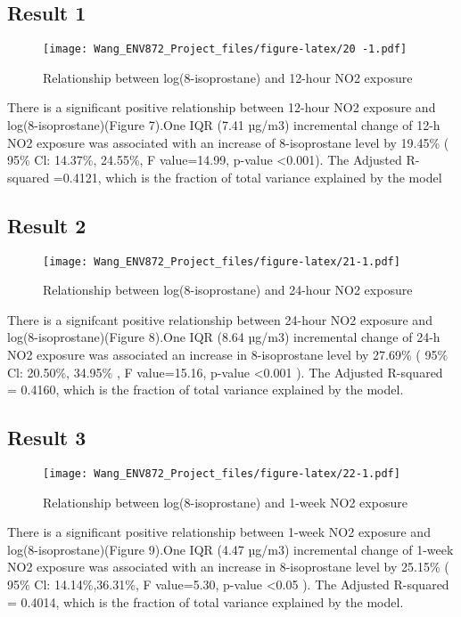 \documentclass[12pt,]{article}
\begin{document}
\hypertarget{result-1}{%
\subsection{Result 1}\label{result-1}}

\begin{figure}
\centering
\texttt{[image: Wang\_ENV872\_Project\_files/figure-latex/20 -1.pdf]}
\caption{Relationship between log(8-isoprostane) and 12-hour NO2
exposure}
\end{figure}

There is a significant positive relationship between 12-hour NO2
exposure and log(8-isoprostane)(Figure 7).One IQR (7.41 µg/m3)
incremental change of 12-h NO2 exposure was associated with an increase
of 8-isoprostane level by 19.45\% ( 95\% Cl: 14.37\%, 24.55\%, F
value=14.99, p-value \textless0.001). The Adjusted R-squared =0.4121,
which is the fraction of total variance explained by the model

\hypertarget{result-2}{%
\subsection{Result 2}\label{result-2}}

\begin{figure}
\centering
\texttt{[image: Wang\_ENV872\_Project\_files/figure-latex/21-1.pdf]}
\caption{Relationship between log(8-isoprostane) and 24-hour NO2
exposure}
\end{figure}

There is a signifcant positive relationship between 24-hour NO2 exposure
and log(8-isoprostane)(Figure 8).One IQR (8.64 µg/m3) incremental change
of 24-h NO2 exposure was associated an increase in 8-isoprostane level
by 27.69\% ( 95\% Cl: 20.50\%, 34.95\% , F value=15.16, p-value
\textless0.001 ). The Adjusted R-squared = 0.4160, which is the fraction
of total variance explained by the model.

\hypertarget{result-3}{%
\subsection{Result 3}\label{result-3}}

\begin{figure}
\centering
\texttt{[image: Wang\_ENV872\_Project\_files/figure-latex/22-1.pdf]}
\caption{Relationship between log(8-isoprostane) and 1-week NO2
exposure}
\end{figure}

There is a significant positive relationship between 1-week NO2 exposure
and log(8-isoprostane)(Figure 9).One IQR (4.47 µg/m3) incremental change
of 1-week NO2 exposure was associated with an increase in 8-isoprostane
level by 25.15\% ( 95\% Cl: 14.14\%,36.31\%, F value=5.30, p-value
\textless0.05 ). The Adjusted R-squared = 0.4014, which is the fraction
of total variance explained by the model.
\end{document}
